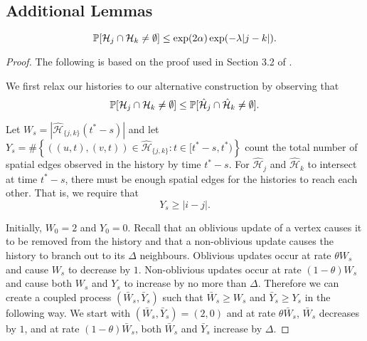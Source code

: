 \subsection{Additional Lemmas}
\begin{lemma}
	\label{lem:intersecting histories bound}
	\begin{equation}
		\mathbb{P}[\mathcal{H}_{j} \cap \mathcal{H}_k \neq \emptyset] \leq \exp(2\alpha) \exp(-\lambda |j - k|).
	\end{equation}
\end{lemma}
\begin{proof}
The following is based on the proof used in Section 3.2 of \cite{Lubetzky2014-po}.

We first relax our histories to our alternative construction by observing that
\begin{equation}
	\mathbb{P}[\mathcal{H}_j \cap \mathcal{H}_k \neq \emptyset] \leq \mathbb{P}[\hat{\mathcal{H}}_j \cap \hat{\mathcal{H}}_k \neq \emptyset].
\end{equation}

Let $W_s = |\hat{\mathcal{H}}_{\{j, k\}} (t^* - s)|$ and let $Y_s = \#\left\{ \left( (u,t), (v,t) \right) \in \hat{\mathcal{H}}_{\{j, k\}}: t \in [t^* - s, t^*) \right\}$ count the total number of spatial edges observed in the history by time $t^* - s$. For $\hat{\mathcal{H}}_j$ and $\hat{\mathcal{H}}_k$ to intersect at time $t^* - s$, there must be enough spatial edges for the histories to reach each other. That is, we require that
\begin{equation}
	Y_s \geq |i - j|.
\end{equation}

Initially, $W_0 = 2$ and $Y_0 = 0$. Recall that an oblivious update of a vertex causes it to be removed from the history and that a non-oblivious update causes the history to branch out to its $\Delta$ neighbours. Oblivious updates occur at rate $\theta W_s$ and cause $W_s$ to decrease by $1$. Non-oblivious updates occur at rate $(1 - \theta)W_s$ and cause both $W_s$ and $Y_s$ to increase by no more than $\Delta$. Therefore we can create a coupled process $(\bar{W}_s, \bar{Y}_s)$ such that $\bar{W}_s \geq W_s$ and $\bar{Y}_s \geq Y_s$ in the following way. We start with $(\bar{W}_s, \bar{Y}_s) = (2, 0)$ and at rate $\theta \bar{W}_s$, $\bar{W}_s$ decreases by $1$, and at rate $(1 - \theta)\bar{W}_s$, both $\bar{W}_s$ and $\bar{Y}_s$ increase by $\Delta$.


\end{proof}
